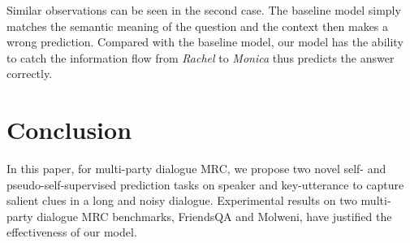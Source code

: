 \documentclass[11pt]{article}
\begin{document}
	Similar observations can be seen in the second case. The baseline model simply matches the semantic meaning of the question and the context then makes a wrong prediction. Compared with the baseline model, our model has the ability to catch the information flow from \emph{Rachel} to \emph{Monica} thus predicts the answer correctly.
	
	
	\section{Conclusion}
	In this paper, for multi-party dialogue MRC, we propose two novel self- and pseudo-self-supervised prediction tasks on speaker and key-utterance to capture salient clues in a long and noisy dialogue. Experimental results on two multi-party dialogue MRC benchmarks, FriendsQA and Molweni, have justified the effectiveness of our model.
	
	

	
	
	\appendix
	
\end{document}
